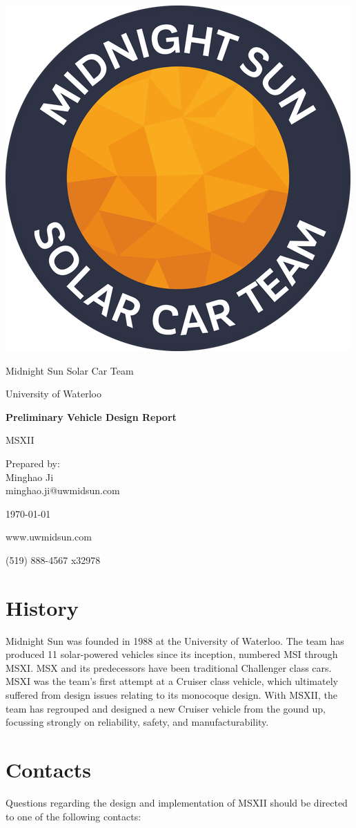 \documentclass[10pt]{article}
\newcommand\thetitle{Preliminary Vehicle Design Report}
\newcommand\theauthor{Midnight Sun Solar Car Team}
\newcommand\thedate{\today}
\begin{document}
\begin{titlepage}
	\vspace*{2cm}
	\centering
	\includegraphics[width=.25\textwidth]{./figures/midnightSunLogoCircle.png}\par
	\vspace{1.5cm}
	{\LARGE \theauthor \par}
	{\large University of Waterloo\par}
	\vspace{2.2cm}
	{\huge\bfseries \thetitle\par} 
	\vspace{0.2cm}
	\large MSXII %
	\vspace{2.2cm}	
	\par Prepared by:\\
	Minghao Ji\\
	minghao.ji@uwmidsun.com\par
	\thedate\par
	\vfill
	www.uwmidsun.com \par
	(519) 888-4567 x32978
\end{titlepage}

\tableofcontents
\listoffigures
\listoftables

\section{History}
Midnight Sun was founded in 1988 at the University of Waterloo. The team has produced 11 solar-powered vehicles since its inception, numbered MSI through MSXI. MSX and its predecessors have been traditional Challenger class cars. MSXI was the team's first attempt at a Cruiser class vehicle, which ultimately suffered from design issues relating to its monocoque design. With MSXII, the team has regrouped and designed a new Cruiser vehicle from the gound up, focussing strongly on reliability, safety, and manufacturability.

\section{Contacts}
Questions regarding the design and implementation of MSXII should be directed to one of the following contacts:
\end{document}
